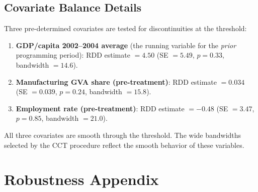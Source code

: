 \documentclass[12pt]{article}
\begin{document}
\subsection{Covariate Balance Details}

Three pre-determined covariates are tested for discontinuities at the threshold:

\begin{enumerate}
    \item \textbf{GDP/capita 2002--2004 average} (the running variable for the \emph{prior} programming period): RDD estimate $= 4.50$ (SE $= 5.49$, $p = 0.33$, bandwidth $= 14.6$).
    \item \textbf{Manufacturing GVA share (pre-treatment)}: RDD estimate $= 0.034$ (SE $= 0.039$, $p = 0.24$, bandwidth $= 15.8$).
    \item \textbf{Employment rate (pre-treatment)}: RDD estimate $= -0.48$ (SE $= 3.47$, $p = 0.85$, bandwidth $= 21.0$).
\end{enumerate}

All three covariates are smooth through the threshold. The wide bandwidths selected by the CCT procedure reflect the smooth behavior of these variables.

\section{Robustness Appendix}
\label{sec:appendix_robust}
\end{document}
